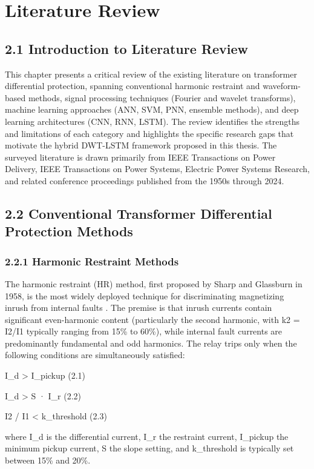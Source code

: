 \chapter{Literature Review}
\label{ch:chapter2}


\section{2.1  Introduction to Literature Review}
This chapter presents a critical review of the existing literature on transformer differential protection, spanning conventional harmonic restraint and waveform-based methods, signal processing techniques (Fourier and wavelet transforms), machine learning approaches (ANN, SVM, PNN, ensemble methods), and deep learning architectures (CNN, RNN, LSTM). The review identifies the strengths and limitations of each category and highlights the specific research gaps that motivate the hybrid DWT-LSTM framework proposed in this thesis. The surveyed literature is drawn primarily from IEEE Transactions on Power Delivery, IEEE Transactions on Power Systems, Electric Power Systems Research, and related conference proceedings published from the 1950s through 2024.


\section{2.2  Conventional Transformer Differential Protection Methods}

\subsection{2.2.1  Harmonic Restraint Methods}
The harmonic restraint (HR) method, first proposed by Sharp and Glassburn in 1958, is the most widely deployed technique for discriminating magnetizing inrush from internal faults \cite{ref7}. The premise is that inrush currents contain significant even-harmonic content (particularly the second harmonic, with k2 = I2/I1 typically ranging from 15\% to 60\%), while internal fault currents are predominantly fundamental and odd harmonics. The relay trips only when the following conditions are simultaneously satisfied:

I\_d > I\_pickup	(2.1)

I\_d > S · I\_r	(2.2)

I2 / I1 < k\_threshold	(2.3)

where I\_d is the differential current, I\_r the restraint current, I\_pickup the minimum pickup current, S the slope setting, and k\_threshold is typically set between 15\% and 20\%.

